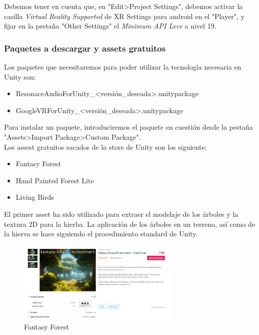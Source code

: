 \quad Debemos tener en cuenta que, en "Edit>Project Settings", debemos activar la casilla \textit{Virtual Reality Supported} de XR Settings para android en el "Player", y fijar en la pestaña "Other Settings" el \textit{Minimum API Leve} a nivel 19.\\

\subsubsection{Paquetes a descargar y assets gratuitos}

\quad Los paquetes que necesitaremos para poder utilizar la tecnología necesaria en Unity son:

\begin{itemize}
	\item ResonaceAudioForUnity\_<versión\_deseada>.unitypackage
	\item GoogleVRForUnity\_<versión\_deseada>.unitypackage
\end{itemize}

\quad Para instalar un paquete, introduciremos el paquete en cuestión desde la pestaña "Assets>Import Package>Custom Package".\\

\quad Los assest gratuitos sacados de la store de Unity son los siguiente:

\begin{itemize}
	\item Fantasy Forest 
	\item Hand Painted Forest Lite
	\item Living Birds
\end{itemize}

\quad El primer asset ha sido utilizado para extraer el modelaje de los árboles y la textura 2D para la hierba. La aplicación de los árboles en un terreno, así como de la hierva se hace siguiendo el procedimiento standard de Unity.

\begin{figure}[htb]
	\centering
	\includegraphics[width=0.7\textwidth]{./imagenes/fantasyForest}
	\caption{Fantasy Forest}
\end{figure} 

